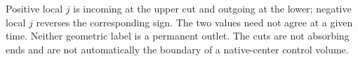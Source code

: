 Positive local $j$ is incoming at the upper cut and outgoing at the lower; negative local $j$ reverses the corresponding sign. The two values need not agree at a given time. Neither geometric label is a permanent outlet. The cuts are not absorbing ends and are not automatically the boundary of a native-center control volume.
